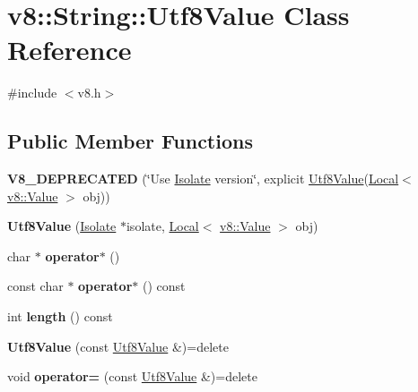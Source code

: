 \hypertarget{classv8_1_1String_1_1Utf8Value}{}\section{v8\+:\+:String\+:\+:Utf8\+Value Class Reference}
\label{classv8_1_1String_1_1Utf8Value}


{\ttfamily \#include $<$v8.\+h$>$}

\subsection*{Public Member Functions}
\begin{DoxyCompactItemize}
\item 
\mbox{\label{classv8_1_1String_1_1Utf8Value_afdf4758f14fa681cbe1c336ba4f81660}} 
{\bfseries V8\+\_\+\+D\+E\+P\+R\+E\+C\+A\+T\+ED} (\char`\"{}Use \mbox{\hyperlink{classv8_1_1Isolate}{Isolate}} version\char`\"{}, explicit \mbox{\hyperlink{classv8_1_1String_1_1Utf8Value}{Utf8\+Value}}(\mbox{\hyperlink{classv8_1_1Local}{Local}}$<$ \mbox{\hyperlink{classv8_1_1Value}{v8\+::\+Value}} $>$ obj))
\item 
\mbox{\label{classv8_1_1String_1_1Utf8Value_a6dd031d0040e83fc7ffc4b4a1c990654}} 
{\bfseries Utf8\+Value} (\mbox{\hyperlink{classv8_1_1Isolate}{Isolate}} $\ast$isolate, \mbox{\hyperlink{classv8_1_1Local}{Local}}$<$ \mbox{\hyperlink{classv8_1_1Value}{v8\+::\+Value}} $>$ obj)
\item 
\mbox{\label{classv8_1_1String_1_1Utf8Value_a6cb4914bc426bbe60b0dfdff32213e59}} 
char $\ast$ {\bfseries operator$\ast$} ()
\item 
\mbox{\label{classv8_1_1String_1_1Utf8Value_af482ca665c7b8f84a1ba148b8be8f36e}} 
const char $\ast$ {\bfseries operator$\ast$} () const
\item 
\mbox{\label{classv8_1_1String_1_1Utf8Value_acf903e28f4aa775e3dbe3a73161fdcbc}} 
int {\bfseries length} () const
\item 
\mbox{\label{classv8_1_1String_1_1Utf8Value_a8a9d1b3ccc59550ecb288eea858dc060}} 
{\bfseries Utf8\+Value} (const \mbox{\hyperlink{classv8_1_1String_1_1Utf8Value}{Utf8\+Value}} \&)=delete
\item 
\mbox{\label{classv8_1_1String_1_1Utf8Value_abb5e79454b29d2b43eeab50baeff377b}} 
void {\bfseries operator=} (const \mbox{\hyperlink{classv8_1_1String_1_1Utf8Value}{Utf8\+Value}} \&)=delete
\end{DoxyCompactItemize}


